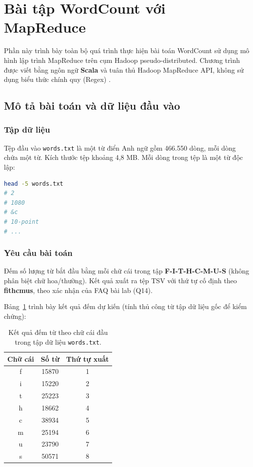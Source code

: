 \section{Bài tập WordCount với MapReduce}
\label{sec:wordcount}


Phần này trình bày toàn bộ quá trình thực hiện bài toán WordCount sử dụng mô hình lập trình MapReduce trên cụm Hadoop pseudo-distributed. Chương trình được viết bằng ngôn ngữ \textbf{Scala} và tuân thủ Hadoop MapReduce API, không sử dụng biểu thức chính quy (Regex) \cite{dean2004mapreduce}.

\subsection{Mô tả bài toán và dữ liệu đầu vào}

\subsubsection{Tập dữ liệu}

Tệp đầu vào \texttt{words.txt} là một từ điển Anh ngữ gồm 466.550 dòng, mỗi dòng chứa một từ. Kích thước tệp khoảng 4,8 MB. Mỗi dòng trong tệp là một từ độc lập:

\begin{lstlisting}[language=bash, numbers=none]
head -5 words.txt
# 2
# 1080
# &c
# 10-point
# ...
\end{lstlisting}

\subsubsection{Yêu cầu bài toán}

Đếm số lượng từ bắt đầu bằng mỗi chữ cái trong tập \textbf{F-I-T-H-C-M-U-S} (không phân biệt chữ hoa/thường). Kết quả xuất ra tệp TSV với thứ tự cố định theo \textbf{fithcmus}, theo xác nhận của FAQ bài lab (Q14).

Bảng~\ref{tab:expected-output} trình bày kết quả đếm dự kiến (tính thủ công từ tập dữ liệu gốc để kiểm chứng):

\begin{table}[H]
\centering
\caption{Kết quả đếm từ theo chữ cái đầu trong tập dữ liệu \texttt{words.txt}.}
\label{tab:expected-output}
\begin{tabular}{ccc}
\toprule
\textbf{Chữ cái} & \textbf{Số từ} & \textbf{Thứ tự xuất} \\
\midrule
f & 15870 & 1 \\
i & 15220 & 2 \\
t & 25223 & 3 \\
h & 18662 & 4 \\
c & 38934 & 5 \\
m & 25194 & 6 \\
u & 23790 & 7 \\
s & 50571 & 8 \\
\bottomrule
\end{tabular}
\end{table}

